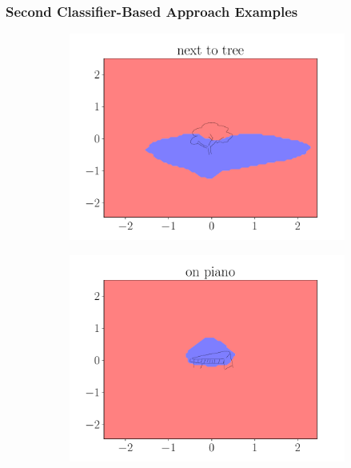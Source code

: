 \documentclass{beamer}
\begin{document}
\begin{frame}
\begin{figure}[ht]
\begin{subfigure}{0.45\textwidth}
        \end{subfigure}
    \end{figure}
\end{frame}

\begin{frame}
    \frametitle{Second Classifier-Based Approach Examples}
    \begin{figure}[ht]
    \centering
        \begin{subfigure}{0.45\textwidth}
            \centering
            \includegraphics[width=\textwidth]{figures/next_to_tree.pdf}
        \end{subfigure}
        \begin{subfigure}{0.45\textwidth}
            \centering
            \includegraphics[width=\textwidth]{figures/on_piano.pdf}

\end{subfigure}
\end{figure}
\end{frame}
\end{document}
